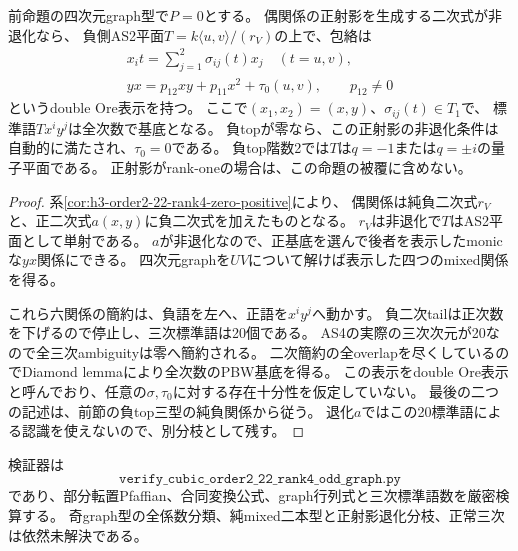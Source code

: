 \begin{proposition}
\label{prop:h3-order2-22-rank4-double-Ore}
前命題の四次元graph型で$P=0$とする。
偶関係の正射影を生成する二次式が非退化なら、
負側AS2平面$T=k\langle u,v\rangle/(r_V)$の上で、包絡は
\begin{gather*}
 x_i t=\sum_{j=1}^2\sigma_{ij}(t)x_j\quad(t=u,v),\\
 yx=p_{12}xy+p_{11}x^2+\tau_0(u,v),\qquad p_{12}\ne0
\end{gather*}
というdouble Ore表示を持つ。
ここで$(x_1,x_2)=(x,y)$、$\sigma_{ij}(t)\in T_1$で、
標準語$T x^iy^j$は全次数で基底となる。
負topが零なら、この正射影の非退化条件は自動的に満たされ、$\tau_0=0$である。
負top階数2では$T$は$q=-1$または$q=\pm i$の量子平面である。
正射影がrank-oneの場合は、この命題の被覆に含めない。
\end{proposition}
\begin{proof}
系\ref{cor:h3-order2-22-rank4-zero-positive}により、
偶関係は純負二次式$r_V$と、正二次式$a(x,y)$に負二次式を加えたものとなる。
$r_V$は非退化で$T$はAS2平面として単射である。
$a$が非退化なので、正基底を選んで後者を表示したmonicな$yx$関係にできる。
四次元graphを$UV$について解けば表示した四つのmixed関係を得る。

これら六関係の簡約は、負語を左へ、正語を$x^iy^j$へ動かす。
負二次tailは正次数を下げるので停止し、三次標準語は20個である。
AS4の実際の三次次元が20なので全三次ambiguityは零へ簡約される。
二次簡約の全overlapを尽くしているのでDiamond lemmaにより全次数のPBW基底を得る。
この表示をdouble Ore表示と呼んでおり、任意の$\sigma,\tau_0$に対する存在十分性を仮定していない。
最後の二つの記述は、前節の負top三型の純負関係から従う。
退化$a$ではこの20標準語による認識を使えないので、別分枝として残す。
\end{proof}

検証器は
\[
 \texttt{verify\_cubic\_order2\_22\_rank4\_odd\_graph.py}
\]
であり、部分転置Pfaffian、合同変換公式、graph行列式と三次標準語数を厳密検算する。
奇graph型の全係数分類、純mixed二本型と正射影退化分枝、正常三次は依然未解決である。
